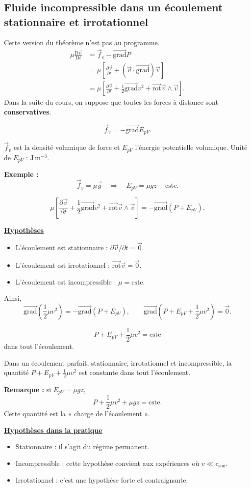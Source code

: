 \documentclass[11pt,a4paper]{article}
\newcommand{\grad}{\overrightarrow{\mathrm{grad}}}
\newcommand{\pd}[2]{\frac{\partial #1}{\partial #2}}
\newcommand{\cste}{\mathrm{cste}}
\newcommand{\titr}[1]{\par\textbf{\underline{#1}}\par\nopagebreak[3]}
\newcommand{\etoiles}[1]{\foreach \i in {1,...,#1}{\mathord{\star}\,}}
\newcommand{\Dv}{\frac{\mathrm D\vec v}{\mathrm Dt}}
\newcommand{\conv}{(\vec v\cdot\grad)\vec v}
\newcommand{\fv}{\vec f_v}\newcommand{\fvt}{\vec f_{v,\mathrm{tot}}}\newcommand{\fvi}{\vec f_{v,\mathrm{inertie}}}
\newcommand{\rot}{\overrightarrow{\mathrm{rot}}}
\newcommand{\epv}{E_{pV}}
\begin{document}
\subsection{Fluide incompressible dans un écoulement stationnaire et irrotationnel}
Cette version du théorème n'est pas au programme.
\begin{align*}
\mu\Dv&=\fv-\grad P\\
&=\mu\left[\pd{\vec v}t+\conv\right]\\
&=\mu\left[\pd{\vec v}t+\frac12\grad v^2+\rot\vec v\wedge\vec v\right].
\end{align*}
Dans la suite du cours, on suppose que toutes les forces à distance sont \textbf{conservatives}.
\begin{cadre}\[\fv=-\grad\epv.\]\end{cadre}
$\fv$ est la densité volumique de force et $\epv$ l'énergie potentielle volumique. Unité de $\epv$ : $\mathrm{J\,m^{-3}}$.
\begin{exemple}\textbf{Exemple :}\[\fv=\mu\vec g\quad\Longrightarrow\quad\epv=\mu gz+\cste.\]\end{exemple}
\[\mu\left[\pd{\vec v}t+\frac12\grad v^2+\rot\vec v\wedge\vec v\right]=-\grad(P+\epv).\]
\titr{Hypothèses}
\begin{itemize}
\item L'écoulement est stationnaire : $\partial\vec v/\partial t=\vec0$.
\item L'écoulement est irrotationnel : $\rot\vec v=\vec0$.
\item L'écoulement est incompressible : $\mu=\cste$.
\end{itemize}
Ainsi,
\[\grad\left(\frac12\mu v^2\right)=-\grad(P+\epv),\qquad\grad\left(P+\epv+\frac12\mu v^2\right)=\vec0.\]
\begin{cadre}[etoiles={\etoiles{5}}]\[P+\epv+\frac12\mu v^2=\cste\]\nobreak dans tout l'écoulement.\end{cadre}
\begin{cadre}[etoiles={\etoiles{4}}]
Dans un écoulement parfait, stationnaire, irrotationnel et incompressible, la quantité $P+\epv+\frac12\mu v^2$ est constante dans tout l'écoulement.
\end{cadre}
\textbf{Remarque :} si $\epv=\mu gz$,
\[P+\frac12\mu v^2+\mu gz=\cste.\]
Cette quantité est la « charge de l'écoulement ».
\titr{Hypothèses dans la pratique}
\begin{itemize}
\item Stationnaire : il s'agit du régime permanent.
\item Incompressible : cette hypothèse convient aux expériences où $v\ll c_{\mathrm{son}}$.
\item Irrotationnel : c'est une hypothèse forte et contraignante.
\end{itemize}
\end{document}
